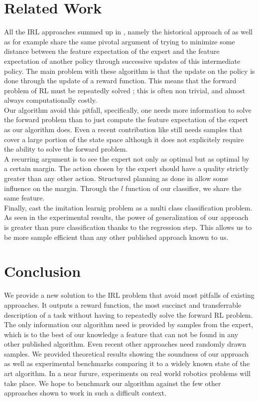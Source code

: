 \documentclass{article} %
\newcommand{\0}{\mathbf{0}}
\newcommand{\1}{\mathbf{1}}
\begin{document}
\section{Related Work}
\label{section: related work}
All the IRL approaches summed up in \cite{neu2009training}, namely the historical approach of \cite{ng2000algorithms} as well as for example \cite{abbeel2004apprenticeship,syed2008apprenticeship,syed2008game, ziebart2008maximum} share the same pivotal argument of trying to minimize some distance between the feature expectation of the expert and the feature expectation of another policy through successive updates of this intermediate policy. The main problem with these algorithm is that the update on the policy is done through the update of a reward function. This means that the forward problem of RL must be repeatedly solved ; this is often non trivial, and almost always computationally costly.\\

Our algorithm avoid this pitfall, specifically, one needs more information to solve the forward problem than to just compute the feature expectation of the expert as our algorithm does. Even a recent contribution like \cite{boularias2011relative} still needs samples that cover a large portion of the state space although it does not explicitely require the ability to solve the forward problem.\\

A recurring argument is to see the expert not only as optimal but as optimal by a certain margin. The action chosen by the expert should have a quality strictly greater than any other action. Structured planning as done in \cite{ratliff2006maximum,ratliff2007imitation, ratliff2007boosting, kolter2008hierarchical} allow some influence on the margin. Through the $l$ function of our classifier, we share the same feature.\\

Finally, \cite{ratliff2007imitation} cast the imitation learnig problem as a multi class classification problem. As seen in the experimental results, the power of generalization of our approach is greater than pure classification thanks to the regression step. This allows us to be more sample efficient than any other published approach known to us.
\section{Conclusion}
We provide a new solution to the IRL problem that avoid most pitfalls of existing approaches. It outputs a reward function, the most succinct and transferrable description of a task without having to repeatedly solve the forward RL problem. The only information our algorithm need is provided by samples from the expert, which is to the best of our knowledge a feature that can not be found in any other published algorithm. Even recent other approaches need randomly drawn samples. We provided theoretical results showing the soundness of our approach as well as experimental benchmarks comparing it to a widely known state of the art algorithm. In a near furure, experiments on real world robotics problems will take place. We hope to benchmark our algorithm against the few other approaches shown to work in such a difficult context.



\end{document}
